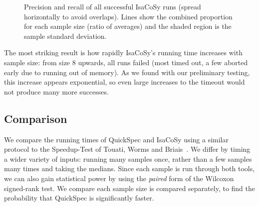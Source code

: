 \begin{figure}
  \centering
  
  \caption{Precision and recall of all successful IsaCoSy runs (spread
    horizontally to avoid overlaps). Lines show the combined proportion for each
    sample size (ratio of averages) and the shaded region is the sample standard
    deviation.}
  \label{figure:isacosy_precRec}
\end{figure}

The most striking result is how rapidly IsaCoSy's running time increases with
sample size: from size 8 upwards, all runs failed (most timed out, a few aborted
early due to running out of memory). As we found with our preliminary testing,
this increase appears exponential, so even large increases to the timeout would
not produce many more successes.


\subsection{Comparison}

We compare the running times of QuickSpec and IsaCoSy using a similar protocol
to the Speedup-Test of Touati, Worms and Briais~\cite{touati2013speedup}. We
differ by timing a wider variety of inputs: running many samples once, rather
than a few samples many times and taking the medians. Since each sample is run
through both tools, we can also gain statistical power by using the
\emph{paired} form of the Wilcoxon signed-rank test. We compare each sample size
is compared separately, to find the probability that QuickSpec is significantly
faster.






